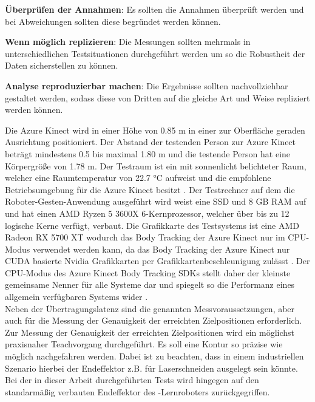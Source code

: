 \begin{compactenumerate}
    \item \textbf{Überprüfen der Annahmen}: Es sollten die Annahmen überprüft werden und bei Abweichungen sollten diese begründet werden können.
    \item \textbf{Wenn möglich replizieren}: Die Messungen sollten mehrmals in unterschiedlichen Testsituationen durchgeführt werden um so die Robustheit der Daten sicherstellen zu können.
    \item \textbf{Analyse reproduzierbar machen}: Die Ergebnisse sollten nachvollziehbar gestaltet werden, sodass diese von Dritten auf die gleiche Art und Weise repliziert werden können.
\end{compactenumerate}

Die Azure Kinect wird in einer Höhe von \num{0,85} m in einer zur Oberfläche geraden Ausrichtung positioniert. Der Abstand der testenden Person zur Azure Kinect beträgt mindestens \num{0,5} bis maximal \num{1,80} m und die testende Person hat eine Körpergröße von \num{1,78} m. Der Testraum ist ein mit sonnenlicht belichteter Raum, welcher eine Raumtemperatur von \num{22,7} °C aufweist und die empfohlene Betriebsumgebung für die Azure Kinect besitzt \cite{tesych_azure_nodate}. Der Testrechner auf dem die Roboter-Gesten-Anwendung ausgeführt wird weist eine SSD und 8 GB RAM auf und hat einen AMD Ryzen 5 3600X 6-Kernprozessor, welcher über bis zu 12 logische Kerne verfügt, verbaut. Die Grafikkarte des Testsystems ist eine AMD Radeon RX 5700 XT wodurch das Body Tracking der Azure Kinect nur im CPU-Modus verwendet werden kann, da das Body Tracking der Azure Kinect nur CUDA basierte Nvidia Grafikkarten per Grafikkartenbeschleunigung zulässt \cite{encausse_body_nodate}. Der CPU-Modus des Azure Kinect Body Tracking SDKs stellt daher der kleinste gemeinsame Nenner für alle Systeme dar und spiegelt so die Performanz eines allgemein verfügbaren Systems wider \cite{azure_kinect_legacy_nodate}.\\

Neben der Übertragungslatenz sind die genannten Messvoraussetzungen, aber auch für die Messung der Genauigkeit der erreichten Zielpositionen erforderlich. Zur Messung der Genauigkeit der erreichten Zielpositionen wird ein möglichst praxisnaher Teachvorgang durchgeführt. Es soll eine Kontur so präzise wie möglich nachgefahren werden. Dabei ist zu beachten, dass in einem industriellen Szenario hierbei der Endeffektor z.B. für Laserschneiden ausgelegt sein könnte. Bei der in dieser Arbeit durchgeführten Tests wird hingegen auf den standarmäßig verbauten Endeffektor des -Lernroboters zurückgegriffen.

